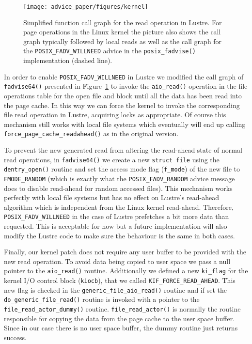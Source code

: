 \begin{figure}[!htb]
  \centering
  \texttt{[image: advice\_paper/figures/kernel]}
  \caption{Simplified function call graph for the read operation in Lustre. For page operations in the Linux kernel the picture also shows the call graph typically followed by local reads as well as the call graph for the \texttt{POSIX\_FADV\_WILLNEED} advice in the \texttt{posix\_fadvise()} implementation (dashed line).}
  \label{figure: kernel}
\end{figure}

In order to enable \texttt{POSIX\_FADV\_WILLNEED} in Lustre we modified the call graph of \texttt{fadvise64()} presented in Figure~\ref{figure: kernel} to invoke the \texttt{aio\_read()} operation in the file operations table for the open file and block until all the data has been read into the page cache. In this way we can force the kernel to invoke the corresponding file read operation in Lustre, acquiring locks as appropriate. Of course this mechanism still works with local file systems which eventually will end up calling \texttt{force\_page\_cache\_readahead()} as in the original version.

To prevent the new generated read from altering the read-ahead state of normal read operations, in \texttt{fadvise64()} we create a new \texttt{struct file} using the \texttt{dentry\_open()} routine and set the access mode flag (\texttt{f\_mode}) of the new file to \texttt{FMODE\_RANDOM} (which is exactly what the \texttt{POSIX\_FADV\_RANDOM} advice message does to disable read-ahead for random accessed files). This mechanism works perfectly with local file systems but has no effect on Lustre's read-ahead algorithm which is independent from the Linux kernel read-ahead. Therefore, \texttt{POSIX\_FADV\_WILLNEED} in the case of Lustre prefetches a bit more data than requested. This is acceptable for now but a future implementation will also modify the Lustre code to make sure the behaviour is the same in both cases.

Finally, our kernel patch does not require any user buffer to be provided with the new read operation. To avoid data being copied to user space we pass a null pointer to the \texttt{aio\_read()} routine. Additionally we defined a new \texttt{ki\_flag} for the kernel I/O control block (\texttt{kiocb}), that we called \texttt{KIF\_FORCE\_READ\_AHEAD}. This new flag is checked in the \texttt{generic\_file\_aio\_read()} routine and if set the \texttt{do\_generic\_file\_read()} routine is invoked with a pointer to the \texttt{file\_read\_actor\_dummy()} routine. \texttt{file\_read\_actor()} is normally the routine responsible for copying the data from the page cache to the user space buffer. Since in our case there is no user space buffer, the dummy routine just returns success.
